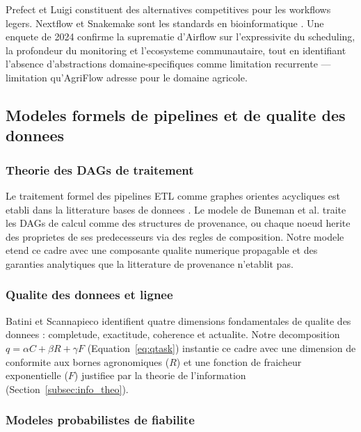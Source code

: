 \documentclass[12pt,a4paper]{article}
\theoremstyle{plain}
\theoremstyle{definition}
\theoremstyle{remark}
\begin{document}
Prefect et Luigi constituent des alternatives competitives pour les
workflows legers. Nextflow et Snakemake sont les standards en
bioinformatique \cite{bioinformatics_workflow}. Une enquete de 2024
\cite{pipeline_survey_2024} confirme la suprematie d'Airflow sur
l'expressivite du scheduling, la profondeur du monitoring et l'ecosysteme
communautaire, tout en identifiant l'absence d'abstractions
domaine-specifiques comme limitation recurrente --- limitation qu'AgriFlow
adresse pour le domaine agricole.

\subsection{Modeles formels de pipelines et de qualite des donnees}

\subsubsection{Theorie des DAGs de traitement}

Le traitement formel des pipelines ETL comme graphes orientes acycliques
est etabli dans la litterature bases de donnees \cite{dag_pipeline_formal}.
Le modele de Buneman et al. \cite{data_provenance} traite les DAGs
de calcul comme des structures de provenance, ou chaque noeud herite
des proprietes de ses predecesseurs via des regles de composition.
Notre modele etend ce cadre avec une composante qualite numerique
propagable et des garanties analytiques que la litterature de provenance
n'etablit pas.

\subsubsection{Qualite des donnees et lignee}

Batini et Scannapieco \cite{data_lineage_quality} identifient quatre
dimensions fondamentales de qualite des donnees : completude, exactitude,
coherence et actualite. Notre decomposition $q = \alpha C + \beta R +
\gamma F$ (Equation~\eqref{eq:qtask}) instantie ce cadre avec une
dimension de conformite aux bornes agronomiques ($R$) et une fonction
de fraicheur exponentielle ($F$) justifiee par la theorie de l'information
(Section~\ref{subsec:info_theo}).

\subsubsection{Modeles probabilistes de fiabilite}
\end{document}
